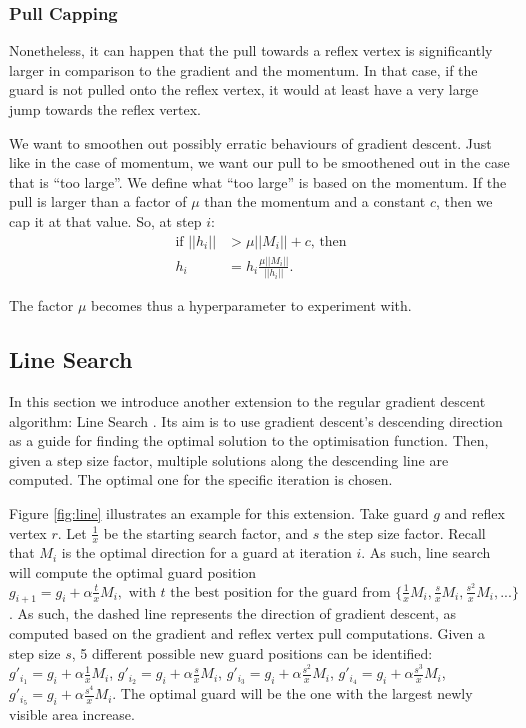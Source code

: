 \subsubsection{Pull Capping}
\label{sec:pull_capping}
Nonetheless, it can happen that the pull towards a reflex vertex is significantly larger in comparison to the gradient and the momentum. In that case, if the guard is not pulled onto the reflex vertex, it would at least have a very large jump towards the reflex vertex.

We want to smoothen out possibly erratic behaviours of gradient descent. Just like in the case of momentum, we want our pull to be smoothened out in the case that is ``too large''. We define what ``too large'' is based on the momentum. If the pull is larger than a factor of $\mu$ than the momentum and a constant $c$, then we cap it at that value. So, at step $i$:
\begin{align*}
    \text{if } ||h_i|| &> \mu ||M_i|| + c \text{, then} \\
               h_i &= h_i \frac{\mu ||M_i||}{||h_i||}.
\end{align*}

The factor $\mu$ becomes thus a hyperparameter to experiment with.


\subsection{Line Search}
\label{sec:line_search}
In this section we introduce another extension to the regular gradient descent algorithm: Line Search \cite{swann1969survey}. Its aim is to use gradient descent's descending direction as a guide for finding the optimal solution to the optimisation function. Then, given a step size factor, multiple solutions along the descending line are computed. The optimal one for the specific iteration is chosen.

Figure \ref{fig:line} illustrates an example for this extension. Take guard $g$ and reflex vertex $r$. Let $\frac 1 x$ be the starting search factor, and $s$ the step size factor. Recall that $M_i$ is the optimal direction for a guard at iteration $i$. As such, line search will compute the optimal guard position $g_{i + 1} = g_i + \alpha\frac{t}{x}M_i, \text{ with } t \text{ the best position for the guard from } \{\frac 1 xM_i, \frac{s}{x}M_i, \frac{s^2}{x}M_i, ...\}$. As such, the dashed line represents the direction of gradient descent, as computed based on the gradient and reflex vertex pull computations. Given a step size $s$, 5 different possible new guard positions can be identified: $g'_{i_1} = g_i + \alpha\frac 1 xM_i$,  $g'_{i_2} = g_i + \alpha\frac s x M_i$, $g'_{i_3} = g_i + \alpha\frac{s^2}{x} M_i$, $g'_{i_4} = g_i + \alpha\frac{s^3}{x} M_i$, $g'_{i_5} = g_i + \alpha\frac{s^4}{x} M_i$. 
The optimal guard will be the one with the largest newly visible area increase.

